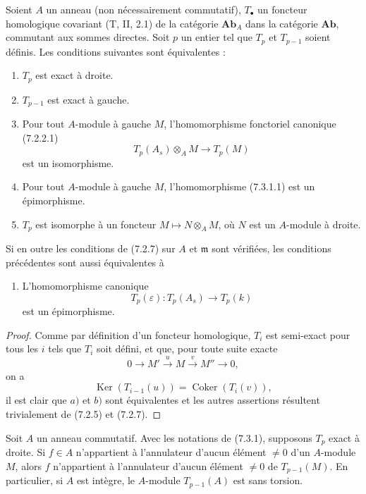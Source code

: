 \begin{proposition}[7.3.1]
Soient $A$ un anneau (non nécessairement commutatif), $T_\bullet$ un foncteur
homologique covariant (T, II, 2.1) de la catégorie $\mathbf{Ab}_A$ dans la
catégorie $\mathbf{Ab}$, commutant aux sommes directes. Soit $p$ un entier tel
que $T_p$ et $T_{p-1}$ soient définis. Les conditions suivantes sont
équivalentes :
\begin{enumerate}
  \item[a)] $T_p$ est exact à droite.
  \item[b)] $T_{p-1}$ est exact à gauche.
  \item[c)] Pour tout $A$-module à gauche $M$, l'homomorphisme fonctoriel
    canonique (7.2.2.1)
    \[
      T_p(A_s)\otimes_A M\longrightarrow T_p(M)
      \tag{7.3.1.1}\label{III.7.3.1.1.fr}
    \]
    est un isomorphisme.
  \item[d)] Pour tout $A$-module à gauche $M$, l'homomorphisme (7.3.1.1) est
    un épimorphisme.
  \item[e)] $T_p$ est isomorphe à un foncteur
    $M\mapsto N\otimes_A M$, où $N$ est un $A$-module à droite.
\end{enumerate}
Si en outre les conditions de (7.2.7) sur $A$ et $\mathfrak m$ sont vérifiées,
les conditions précédentes sont aussi équivalentes à
\begin{enumerate}
  \item[f)] L'homomorphisme canonique
    \[
      T_p(\varepsilon):T_p(A_s)\longrightarrow T_p(k)
    \]
    est un épimorphisme.
\end{enumerate}
\end{proposition}

\begin{proof}
Comme par définition d'un foncteur homologique, $T_i$ est semi-exact pour tous
les $i$ tels que $T_i$ soit défini, et que, pour toute suite exacte
\[
  0\longrightarrow M'\xrightarrow{u}M\xrightarrow{v}M''\longrightarrow0,
\]
on a
\[
  \operatorname{Ker}(T_{i-1}(u))
  =
  \operatorname{Coker}(T_i(v)),
\]
il est clair que $a)$ et $b)$ sont équivalentes et les autres assertions
résultent trivialement de (7.2.5) et (7.2.7).
\end{proof}

\begin{corollary}[7.3.2]
Soit $A$ un anneau commutatif. Avec les notations de (7.3.1), supposons $T_p$
exact à droite. Si $f\in A$ n'appartient à l'annulateur d'aucun élément
$\ne0$ d'un $A$-module $M$, alors $f$ n'appartient à l'annulateur d'aucun
élément $\ne0$ de $T_{p-1}(M)$. En particulier, si $A$ est intègre, le
$A$-module $T_{p-1}(A)$ est sans torsion.
\end{corollary}

